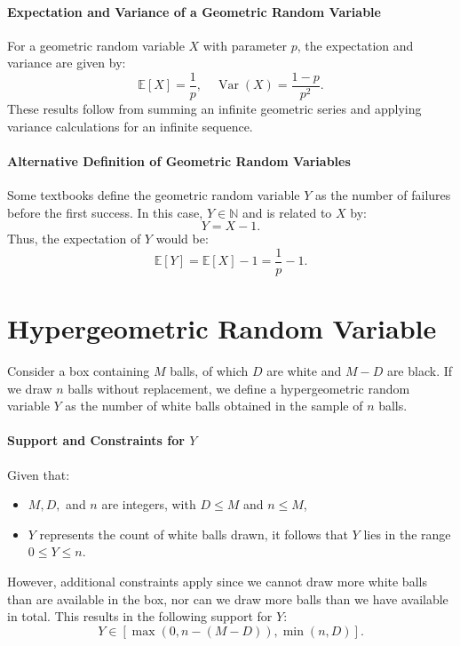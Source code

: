 \paragraph{Expectation and Variance of a Geometric Random Variable}
For a geometric random variable \( X \) with parameter \( p \), the expectation and variance are given by:
\[
\mathbb{E}[X] = \frac{1}{p}, \quad \operatorname{Var}(X) = \frac{1 - p}{p^2}.
\]
These results follow from summing an infinite geometric series and applying variance calculations for an infinite sequence.

\paragraph{Alternative Definition of Geometric Random Variables}
Some textbooks define the geometric random variable \( Y \) as the number of failures before the first success. In this case, \( Y \in \mathbb{N} \) and is related to \( X \) by:
\[
Y = X - 1.
\]
Thus, the expectation of \( Y \) would be:
\[
\mathbb{E}[Y] = \mathbb{E}[X] - 1 = \frac{1}{p} - 1.
\]

\section{Hypergeometric Random Variable}
Consider a box containing \( M \) balls, of which \( D \) are white and \( M - D \) are black. If we draw \( n \) balls without replacement, we define a hypergeometric random variable \( Y \) as the number of white balls obtained in the sample of \( n \) balls.

\paragraph{Support and Constraints for \( Y \)}
Given that:
\begin{itemize}
    \item \( M, D, \) and \( n \) are integers, with \( D \leq M \) and \( n \leq M \),
    \item \( Y \) represents the count of white balls drawn, it follows that \( Y \) lies in the range \( 0 \leq Y \leq n \).
\end{itemize}
However, additional constraints apply since we cannot draw more white balls than are available in the box, nor can we draw more balls than we have available in total. This results in the following support for \( Y \):
\[
Y \in \left[ \max(0, n - (M - D)), \min(n, D) \right].
\]

